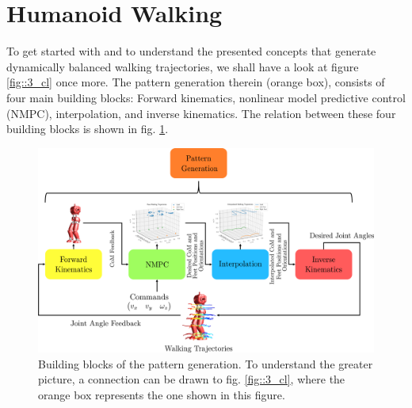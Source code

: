 \section{Humanoid Walking}
\label{sec::31_hw}
To get started with and to understand the presented concepts that generate dynamically balanced walking trajectories, we shall have a look at figure \ref{fig::3_cl} once more. The pattern generation therein (orange box), consists of four main building blocks: Forward kinematics, nonlinear model predictive control (NMPC), interpolation, and inverse kinematics. The relation between these four building blocks is shown in fig. \ref{fig::31_pg}.
\begin{figure}[h!]
	\centering
	\includegraphics[scale=.5]{chapters/03_background/img/pattern_generation.png}
	\caption{Building blocks of the pattern generation. To understand the greater picture, a connection can be drawn to fig. \ref{fig::3_cl}, where the orange box represents the one shown in this figure.}
	\label{fig::31_pg}
\end{figure}
